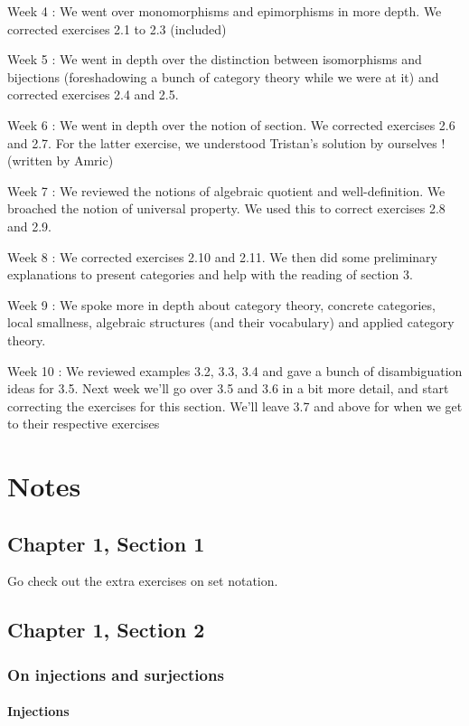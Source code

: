 \documentclass[12pt, letterpaper, twoside]{report}
\begin{document}
Week 4 : We went over monomorphisms and epimorphisms in more depth. We corrected exercises 2.1 to 2.3 (included)

Week 5 : We went in depth over the distinction between isomorphisms and bijections (foreshadowing a bunch of category theory while we were at it) and corrected exercises 2.4 and 2.5.

Week 6 : We went in depth over the notion of section. We corrected exercises 2.6 and 2.7. For the latter exercise, we understood Tristan's solution by ourselves ! (written by Amric)

Week 7 : We reviewed the notions of algebraic quotient and well-definition. We broached the notion of universal property. We used this to correct exercises 2.8 and 2.9.

Week 8 : We corrected exercises 2.10 and 2.11. We then did some preliminary explanations to present categories and help with the reading of section 3.

Week 9 : We spoke more in depth about category theory, concrete categories, local smallness, algebraic structures (and their vocabulary) and applied category theory.

Week 10 :
We reviewed examples 3.2, 3.3, 3.4 and gave a bunch of disambiguation ideas for 3.5. Next week we'll go over 3.5 and 3.6 in a bit more detail, and start correcting the exercises for this section. We'll leave 3.7 and above for when we get to their respective exercises

\newpage
\part{Notes}
\chapter*{Chapter 1, Section 1}

Go check out the extra exercises on set notation.
\chapter*{Chapter 1, Section 2}

\section*{On injections and surjections}

\subsection*{Injections}
\end{document}
